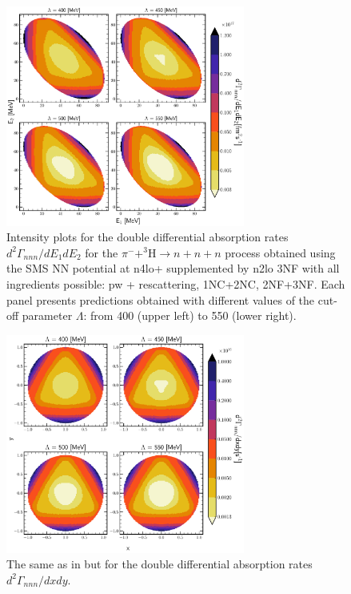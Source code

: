     \begin{figure}[h]
        \begin{center}
        \includegraphics[width=0.7\textwidth]{PlotData/PION/Dalitz_maps/figures/Dalitz_map_nnn_E1E2_cutofs.pdf}
        \end{center}
        \caption{Intensity plots for the double differential absorption rates
        $d^2 \Gamma_{nnn}/dE_1dE_2$ for the $\pi^- + ^3\text{H} \rightarrow n + n + n$
        process obtained using the SMS NN potential at \gls{n4lo+} supplemented by \gls{n2lo} 3NF
        with all ingredients possible: \gls{pw} + rescattering, 1NC+2NC, 2NF+3NF.
        Each panel presents predictions obtained with different values of the cut-off parameter $\Lambda$:
        from \SI{400}{\mev} (upper left) to \SI{550}{\mev} (lower right).}
        \label{pion_nnn_E1E2_cutoff}
    \end{figure}

    \begin{figure}[h]
        \begin{center}
        \includegraphics[width=0.7\textwidth]{PlotData/PION/Dalitz_maps/figures/Dalitz_map_nnn_xy_cutofs.pdf}
        \end{center}
        \caption{The same as in  but for the double differential absorption rates
        $d^2 \Gamma_{nnn}/dxdy$.}
        \label{pion_nnn_xy_cutoff}
    \end{figure}

